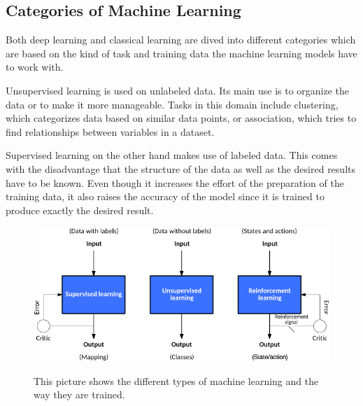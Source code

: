 
\subsection{Categories of Machine Learning}
Both deep learning and classical learning are dived into different categories which are based on the kind of task and training data the machine learning models have to work with.

Unsupervised learning is used on unlabeled data. Its main use is to organize the data or to make it more manageable. Tasks in this domain include clustering, which categorizes data based on similar data points, or association, which tries to find relationships between variables in a dataset\cite{supervised-unsupervised-learning}.

Supervised learning on the other hand makes use of labeled data. This comes with the disadvantage that the structure of the data as well as the desired results have to be known\cite{classical-ml}. Even though it increases the effort of the preparation of the training data, it also raises the accuracy of the model since it is trained to produce exactly the desired result.



\begin{figure}[ht]
  \caption[Different kinds of machine learning]{This picture shows the different types of machine learning and the way they are trained\cite{types-of-ml}.} %
  \centering
  \includegraphics[width=\linewidth]{img/types_of_machine_learning.png}\label{fig:kinds_of_ml}
\end{figure}
